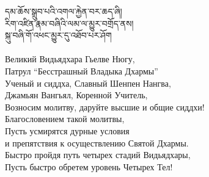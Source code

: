 དམ་ཆོས་སྒྲུབ་པའི་འགལ་རྐྱེན་བར་ཆད་ཞི།\\
རིག་འཛིན་རྣམ་བཞིའི་ལམ་ལ་མྱུར་བགྲོད་ནས།\\
སྐུ་བཞི་གོ་འཕང་མྱུར་དུ་འཐོབ་པར་ཤོག\\
\\
\ru
Великий Видьядхара Гьелве Нюгу,\\
Патрул “Бесстрашный Владыка Дхармы”\\
Ученый и сиддха, Славный Шенпен Нангва,\\
Джамьян Вангьял, Коренной Учитель,\\
Возносим молитву, даруйте высшие и общие сиддхи!\\
Благословением такой молитвы,\\
Пусть усмирятся дурные условия\\
и препятствия к осуществлению Святой Дхармы.\\
Быстро пройдя путь четырех стадий Видьядхары,\\
Пусть быстро обретем уровень Четырех Тел!
\\
\newpage
